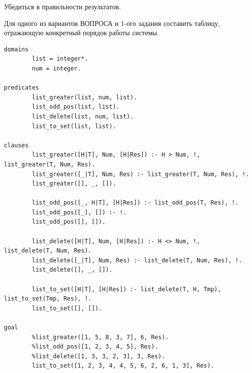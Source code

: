 \documentclass[12pt,a4paper]{scrreprt}
\begin{document}
Убедиться в правильности результатов.

Для одного из вариантов ВОПРОСА и 1-ого задания составить таблицу, отражающую конкретный порядок работы системы.

\begin{lstlisting}
domains
		list = integer*.
		num = integer.

predicates
		list_greater(list, num, list).
		list_odd_pos(list, list).
		list_delete(list, num, list).
		list_to_set(list, list).
	
clauses
		list_greater([H|T], Num, [H|Res]) :- H > Num, !, list_greater(T, Num, Res).
		list_greater([_|T], Num, Res) :- list_greater(T, Num, Res), !.
		list_greater([], _, []).
		
		list_odd_pos([_, H|T], [H|Res]) :- list_odd_pos(T, Res), !.
		list_odd_pos([_], []) :- !.
		list_odd_pos([], []).
		
		list_delete([H|T], Num, [H|Res]) :- H <> Num, !, list_delete(T, Num, Res).
		list_delete([_|T], Num, Res) :- list_delete(T, Num, Res), !.
		list_delete([], _, []).
		
		list_to_set([H|T], [H|Res]) :- list_delete(T, H, Tmp), list_to_set(Tmp, Res), !.
		list_to_set([], []).
	
goal
		%list_greater([1, 5, 8, 3, 7], 6, Res).
		%list_odd_pos([1, 2, 3, 4, 5], Res).
		%list_delete([1, 3, 3, 2, 3], 3, Res).
		list_to_set([1, 2, 3, 4, 4, 5, 6, 2, 6, 1, 3], Res).
\end{lstlisting}
	
\end{document}

